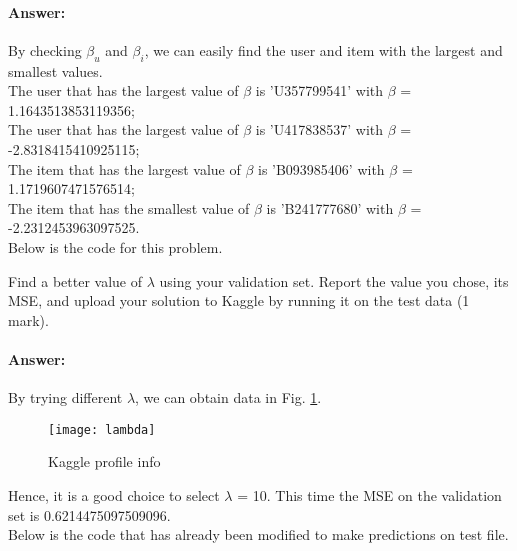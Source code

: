 \documentclass{assignment}
\begin{document}
\begin{problemlist}
\paragraph{Answer:}
By checking $\beta_u$ and $\beta_i$, we can easily find the user and item with the largest and smallest values.\\
The user that has the largest value of $\beta$ is 'U357799541' with $\beta$ = 1.1643513853119356;\\
The user that has the largest value of $\beta$ is 'U417838537' with $\beta$ = -2.8318415410925115;\\
The item that has the largest value of $\beta$ is 'B093985406' with $\beta$ = 1.1719607471576514;\\
The item that has the smallest value of $\beta$ is 'B241777680' with $\beta$ =  -2.2312453963097525.\\

Below is the code for this problem.


\newpage

\pbitem
Find a better value of $\lambda$ using your validation set. Report the value you chose, its MSE, and upload your solution to Kaggle by running it on the test data (1 mark).
\paragraph{Answer:}
By trying different $\lambda$, we can obtain data in Fig. \ref{fig:lambda}.

\begin{figure}[htbp]
	\centering
	\texttt{[image: lambda]}
	\caption{Kaggle profile info}
    \label{fig:lambda}
\end{figure}

Hence, it is a good choice to select $\lambda$ = 10. This time the MSE on the validation set is 0.6214475097509096.\\

Below is the code that has already been modified to make predictions on test file.\\



\end{problemlist}
\end{document}
